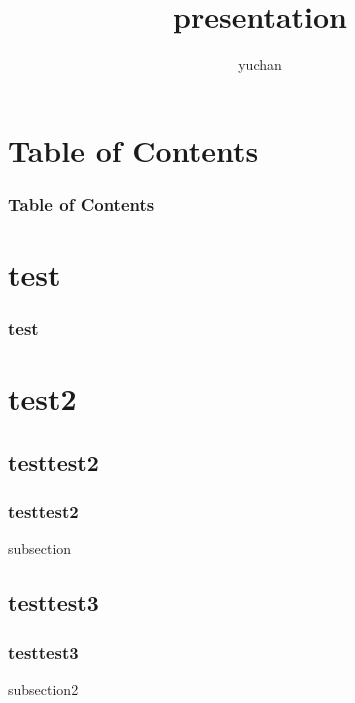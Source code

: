 \documentclass[dvipdfmx,11pt]{beamer}
\title{presentation}
\author{yuchan}
\begin{document}
\begin{frame}
  \frametitle{}
  \titlepage
\end{frame}

\section*{Table of Contents}
\begin{frame}
  \frametitle{Table of Contents}
  \tableofcontents
\end{frame}

\section{test}
\begin{frame}
\frametitle{test}
\end{frame}

\section{test2}
\subsection{testtest2}
\begin{frame}
\frametitle{testtest2}
subsection
\end{frame}
\subsection{testtest3}
\begin{frame}
\frametitle{testtest3}
subsection2
\end{frame}
\end{document}
